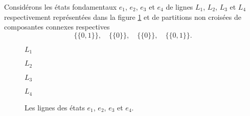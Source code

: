 \begin{Ex}
Considérons  les états fondamentaux  $e_{1}$, $e_{2}$, $e_{3}$ et $e_{4}$ de lignes $L_{1}$, $L_{2}$, $L_{3}$ et $L_{4}$ respectivement représentées dans la figure \ref{Atfig262222} et de partitions non croisées de composantes connexes  respectives $$\{\{0,1\}\}, \quad\{\{0\}\}, \quad  \{\{0\}\}, \quad \{\{0,1\}\}.$$
\begin{figure}[!htb]
\begin{minipage}[c]{.46\linewidth}
  \centering
\begin{logicpuzzle}[rows=1,columns=7,color=cyan!100, width=750px,scale=0.5]
\framepuzzle[black!50]
\end{logicpuzzle}
$L_{1}$\quad\quad\quad\quad\quad\quad\quad\quad
\end{minipage}
\hfill
\begin{minipage}[c]{.46\linewidth}
  \centering
\begin{logicpuzzle}[rows=1,columns=7,color=cyan!100, width=750px,scale=0.5]
\framepuzzle[black!50]
\end{logicpuzzle}
$L_{2}$ \quad\quad\quad\quad\quad\quad\quad
\end{minipage}
\hfill
\begin{minipage}[c]{.46\linewidth}
  \centering
\begin{logicpuzzle}[rows=1,columns=5,color=cyan!100, width=750px,scale=0.5]
\framepuzzle[black!50]
\end{logicpuzzle}
$L_{3}$\quad\quad\quad\quad\quad\quad\quad\quad\quad\quad
\end{minipage}
\hfill
\begin{minipage}[c]{.46\linewidth}
  \centering
\begin{logicpuzzle}[rows=1,columns=3,color=cyan!100, width=750px,scale=0.5]
\framepuzzle[black!50]
\end{logicpuzzle}
$L_{4}$\quad\quad\quad\quad\quad\quad\quad\quad\quad\quad\quad\quad
\end{minipage}
\hfill
\caption{\label{Atfig262222} Les lignes des états $e_{1}$, $e_{2}$, $e_{3}$ et $e_{4}$.}
\end{figure} 

\end{Ex}
